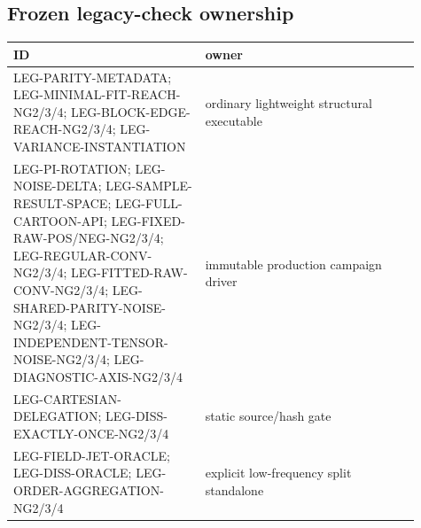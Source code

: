 \subsection{Frozen legacy-check ownership}
\begin{longtable}{p{0.43\linewidth}p{0.48\linewidth}}
\toprule ID & owner\\\midrule
LEG-PARITY-METADATA; LEG-MINIMAL-FIT-REACH-NG2/3/4;
LEG-BLOCK-EDGE-REACH-NG2/3/4; LEG-VARIANCE-INSTANTIATION &
ordinary lightweight structural executable\\
LEG-PI-ROTATION; LEG-NOISE-DELTA; LEG-SAMPLE-RESULT-SPACE;
LEG-FULL-CARTOON-API; LEG-FIXED-RAW-POS/NEG-NG2/3/4;
LEG-REGULAR-CONV-NG2/3/4; LEG-FITTED-RAW-CONV-NG2/3/4;
LEG-SHARED-PARITY-NOISE-NG2/3/4;
LEG-INDEPENDENT-TENSOR-NOISE-NG2/3/4;
LEG-DIAGNOSTIC-AXIS-NG2/3/4 & immutable production campaign driver\\
LEG-CARTESIAN-DELEGATION; LEG-DISS-EXACTLY-ONCE-NG2/3/4 & static source/hash gate\\
LEG-FIELD-JET-ORACLE; LEG-DISS-ORACLE; LEG-ORDER-AGGREGATION-NG2/3/4 &
explicit low-frequency split standalone\\\bottomrule
\end{longtable}
